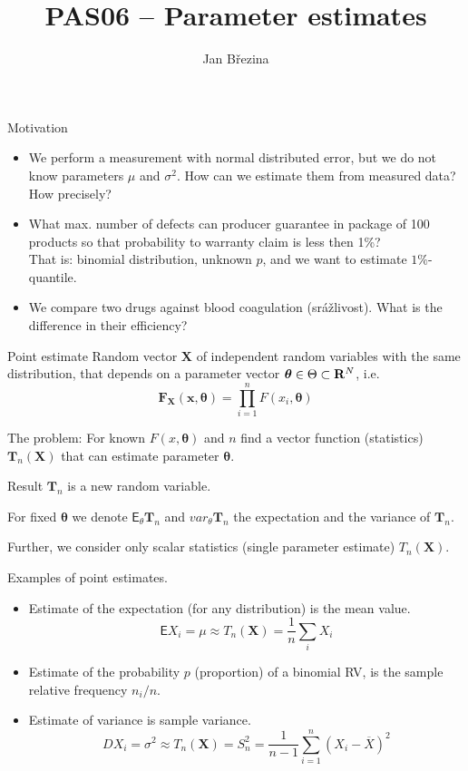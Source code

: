 \documentclass[smaller]{beamer}
\title{PAS06 -- Parameter estimates}
\author{Jan B\v rezina}
\institute %
{
  Technical University of Liberec
}
\def\Real{{\rm\bf R}}
\def\vc#1{\mathbf{\boldsymbol{#1}}}     %
\def\blue#1{{\usebeamercolor[fg]{my blue} #1}}
\def\xskip{{\vspace{2ex}}}
\def\E{\vc{\mathsf{E}}}
\begin{document}
\begin{frame}
  \titlepage
\end{frame}


\begin{frame}{Motivation}
 \begin{itemize}
  \item  We perform a measurement with normal distributed error, but we do not know parameters $\mu$ and $\sigma^2$.
    How can we estimate them from measured data? How precisely?
  \pause  
  \item What max. number of defects can producer guarantee in package of 100 products so that probability to warranty claim is less then 1\%?\\
        That is: binomial distribution, unknown $p$, and we want to estimate $1\%$-quantile.
  \pause      
  \item We compare two drugs against blood coagulation (srážlivost). What is the difference in their efficiency?
 \end{itemize}

\end{frame}


\begin{frame}{Point estimate}
Random vector $\vc X$ of independent random variables with the same distribution, that depends on a parameter vector
$\vc \theta \in \Theta \subset \Real^N$, i.e.
\[
 \vc F_{\vc X}(\vc x, \vc \theta) = \prod_{i=1}^n F(x_i,\vc \theta)
\]

\xskip
\blue{The problem:} For known $F(x,\vc \theta)$ and $n$ find a vector function (statistics) $\vc T_n(\vc X)$ that can estimate parameter $\vc \theta$.

Result $\vc T_n$ is a new random variable.

For fixed $\vc \theta$ we denote $\E_\theta \vc T_n$ and $var_\theta \vc T_n$ the expectation and the variance of $\vc T_n$.

\xskip
Further,  we consider only scalar statistics (single parameter estimate) $T_n(\vc X)$.
\end{frame}

\begin{frame}{Examples of point estimates.}
 \begin{itemize}
  \item Estimate of the expectation (for any distribution) is the mean value.
        \[
            \E X_i = \mu \approx T_n(\vc X) = \frac{1}{n} \sum_i X_i
        \]

  \item Estimate of the probability $p$ (proportion) of a binomial RV, is the sample relative frequency $n_i / n$.

  \item Estimate of variance is  sample variance.
        \[
            DX_i = \sigma^2 \approx T_n(\vc X) = S_n^2 =\frac{1}{n-1} \sum_{i=1}^n (X_i - \overline{X})^2 
        \]
 \end{itemize}

\end{frame}
\end{document}
